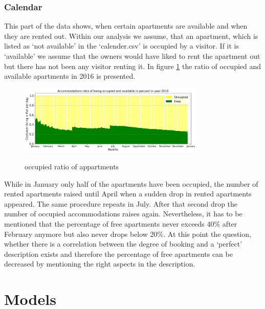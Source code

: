 \documentclass[journal]{IEEEtran}
\begin{document}
\subsubsection{Calendar}
This part of the data shows, when certain apartments are available and when they are rented out. Within our analysis we assume, that an apartment, which is listed as ‘not available’ in the ‘calender.csv’ is occupied by a visitor. If it is ‘available’ we assume that the owners would have liked to rent the apartment out but there has not been any visitor renting it. In figure \ref{occupied_ratio_appartments} the ratio of occupied and available apartments in 2016 is presented.
%
\begin{figure}
  \begin{center}
  \includegraphics[width=3.5in]{photo/11_acc_ratio_occupied.png}\\
  \caption{occupied ratio of appartments}\label{occupied_ratio_appartments}
  \end{center}
\end{figure}
%
While in January only half of the apartments have been occupied, the number of rented apartments raised until April when a sudden drop in rented apartments appeared. The same procedure repeats in July. After that second drop the number of occupied accommodations raises again. Nevertheless, it has to be mentioned that the percentage of free apartments never exceeds 40\% after February anymore but also never drops below 20\%. At this point the question, whether there is a correlation between the degree of booking and a ‘perfect’ description exists and therefore the percentage of free apartments can be decreased by mentioning the right aspects in the description. 

\section{Models}
\end{document}
